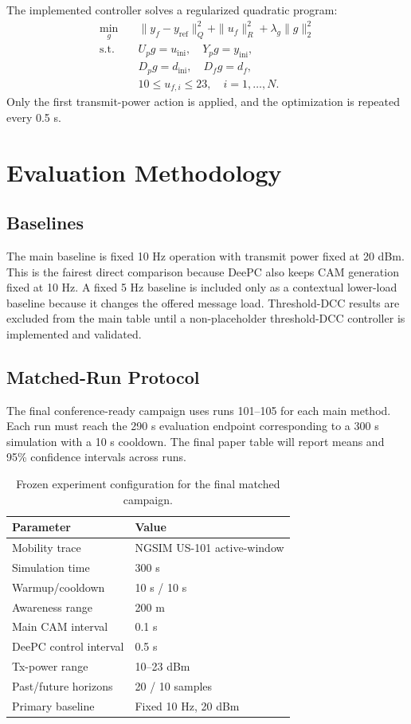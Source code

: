 \documentclass[conference]{IEEEtran}
\begin{document}
The implemented controller solves a regularized quadratic program:
\begin{align}
\min_g \quad &
\|y_f - y_{\mathrm{ref}}\|_Q^2 + \|u_f\|_R^2 + \lambda_g \|g\|_2^2\\
\mathrm{s.t.}\quad &
U_p g = u_{\mathrm{ini}},\quad Y_p g = y_{\mathrm{ini}},\\
&D_p g = d_{\mathrm{ini}},\quad D_f g = d_f,\\
&10 \leq u_{f,i} \leq 23,\quad i=1,\ldots,N.
\end{align}
Only the first transmit-power action is applied, and the optimization is repeated every 0.5 s.

\section{Evaluation Methodology}

\subsection{Baselines}

The main baseline is fixed 10 Hz operation with transmit power fixed at 20 dBm. This is the fairest direct comparison because DeePC also keeps CAM generation fixed at 10 Hz. A fixed 5 Hz baseline is included only as a contextual lower-load baseline because it changes the offered message load. Threshold-DCC results are excluded from the main table until a non-placeholder threshold-DCC controller is implemented and validated.

\subsection{Matched-Run Protocol}

The final conference-ready campaign uses runs 101--105 for each main method. Each run must reach the 290 s evaluation endpoint corresponding to a 300 s simulation with a 10 s cooldown. The final paper table will report means and 95\% confidence intervals across runs.

\begin{table}[t]
\centering
\caption{Frozen experiment configuration for the final matched campaign.}
\label{tab:config}
\begin{tabular}{ll}
\toprule
Parameter & Value\\
\midrule
Mobility trace & NGSIM US-101 active-window\\
Simulation time & 300 s\\
Warmup/cooldown & 10 s / 10 s\\
Awareness range & 200 m\\
Main CAM interval & 0.1 s\\
DeePC control interval & 0.5 s\\
Tx-power range & 10--23 dBm\\
Past/future horizons & 20 / 10 samples\\
Primary baseline & Fixed 10 Hz, 20 dBm\\
\bottomrule
\end{tabular}
\end{table}
\end{document}
